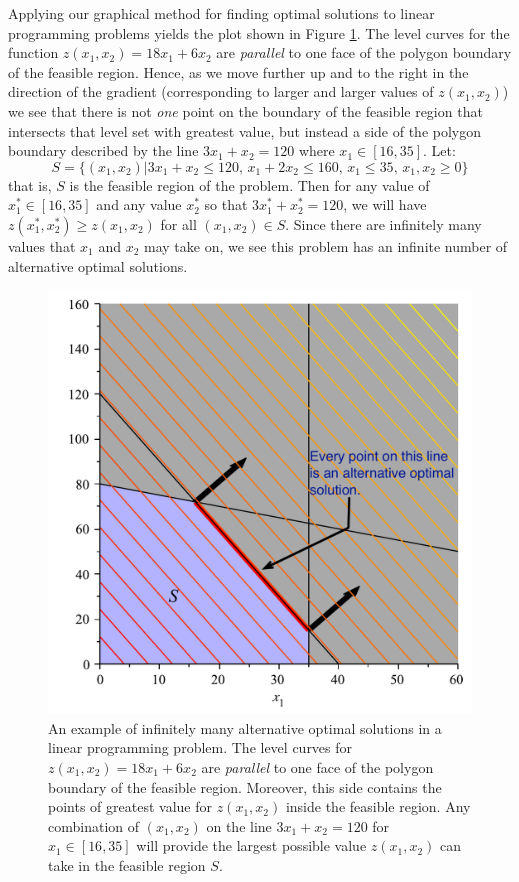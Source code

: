 \begin{solution}
Applying our graphical method for finding optimal solutions to linear programming problems yields the plot shown in Figure \ref{fig:ToyMakerAltOptSoln}. The level curves for the function $z(x_1,x_2) = 18x_1 + 6x_2$ are \textit{parallel} to one face of the polygon boundary of the feasible region. Hence, as we move further up and to the right in the direction of the gradient (corresponding to larger and larger values of $z(x_1, x_2)$) we see that there is not \textit{one} point on the boundary of the feasible region that intersects that level set with greatest value, but instead a side of the polygon boundary described by the line $3x_1 + x_2 = 120$ where $x_1 \in [16, 35]$. Let:
\begin{displaymath}
S = \{(x_1,x_2) | 3x_1 + x_2 \leq 120,\,x_1 + 2x_2 \leq 160,\,x_1 \leq 35,\,x_1,x_2 \geq 0\}
\end{displaymath} 
that is, $S$ is the feasible region of the problem. Then for any value of $x_1^* \in [16,35]$ and any value $x_2^*$ so that  $3x_1^* + x_2^* = 120$, we will have $z(x_1^*, x_2^*) \geq z(x_1, x_2)$ for all $(x_1,x_2) \in S$. Since there are infinitely many values that $x_1$ and $x_2$  may take on, we see this problem has an infinite number of alternative optimal solutions.
\begin{figure}[H]
\centering
\includegraphics[scale=0.4]{AltOptSolns.pdf}
\caption{An example of infinitely many alternative optimal solutions in a linear programming problem. The level curves for $z(x_1,x_2) = 18x_1 + 6x_2$ are \textit{parallel} to one face of the polygon boundary of the feasible region. Moreover, this side contains the points of greatest value for $z(x_1,x_2)$ inside the feasible region. Any combination of $(x_1,x_2)$ on the line $3x_1 + x_2 = 120$ for $x_1 \in [16, 35]$ will provide the largest possible value $z(x_1,x_2)$ can take in the feasible region $S$.}
\label{fig:ToyMakerAltOptSoln}
\end{figure}
\end{solution}
